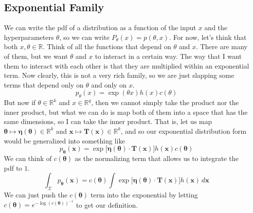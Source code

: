 \documentclass{article}
\theoremstyle{definition}
\theoremstyle{remark}
\theoremstyle{definition}
\begin{document}
\subsection{Exponential Family}

We can write the pdf of a distribution as a function of the input $x$ and the hyperparameters $\theta$, so we can write $P_\theta (x) = p(\theta, x)$. For now, let's think that both $x, \theta \in \mathbb{R}$. Think of all the functions that depend on $\theta$ and $x$. There are many of them, but we want $\theta$ and $x$ to interact in a certain way. The way that I want them to interact with each other is that they are multiplied within an exponential term. Now clearly, this is not a very rich family, so we are just slapping some terms that depend only on $\theta$ and only on $x$. 
\[p_\theta (x) = \exp(\theta x) h(x) c(\theta)\]
But now if $\theta \in \mathbb{R}^k$ and $x \in \mathbb{R}^q$, then we cannot simply take the product nor the inner product, but what we can do is map both of them into a space that has the same dimensions, so I can take the inner product. That is, let us map $\boldsymbol{\theta} \mapsto \boldsymbol{\eta}(\boldsymbol{\theta}) \in \mathbb{R}^k$ and $\mathbf{x} \mapsto \mathbf{T}(\mathbf{x}) \in \mathbb{R}^k$, and so 
our exponential distribution form would be generalized into something like 
\[p_{\boldsymbol{\theta}} (\mathbf{x}) = \exp\big[ \boldsymbol{\eta}(\boldsymbol{\theta}) \cdot \mathbf{T}(\mathbf{x}) \big] h(\mathbf{x}) c(\boldsymbol{\theta})\]
We can think of $c(\boldsymbol{\theta})$ as the normalizing term that allows us to integrate the pdf to $1$. 
\[\int_\mathcal{X} p_{\boldsymbol{\theta}} (\mathbf{x}) = c(\boldsymbol{\theta}) \int \exp\big[\boldsymbol{\eta}(\boldsymbol{\theta}) \cdot \mathbf{T}(\mathbf{x}) \big] h(\mathbf{x})  \,d\mathbf{x}\]
We can just push the $c(\boldsymbol{\theta})$ term into the exponential by letting $c(\boldsymbol{\theta}) = e^{-\log(c(\boldsymbol{\theta}))^{-1}}$ to get our definition. 
\end{document}
